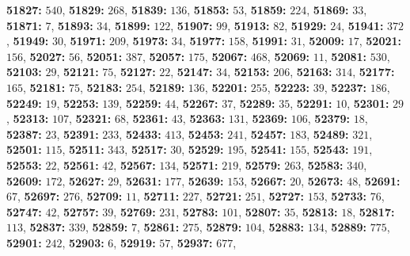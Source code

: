 \textsf{\bfseries 51827:} $540$, \textsf{\bfseries 51829:} $268$, \textsf{\bfseries 51839:} $136$, \textsf{\bfseries 51853:} $53$, \textsf{\bfseries 51859:} $224$, \textsf{\bfseries 51869:} $33$, \textsf{\bfseries 51871:} $7$, \textsf{\bfseries 51893:} $34$, \textsf{\bfseries 51899:} $122$, \textsf{\bfseries 51907:} $99$, \textsf{\bfseries 51913:} $82$, \textsf{\bfseries 51929:} $24$, \textsf{\bfseries 51941:} $372$, \textsf{\bfseries 51949:} $30$, \textsf{\bfseries 51971:} $209$, \textsf{\bfseries 51973:} $34$, \textsf{\bfseries 51977:} $158$, \textsf{\bfseries 51991:} $31$, \textsf{\bfseries 52009:} $17$, \textsf{\bfseries 52021:} $156$, \textsf{\bfseries 52027:} $56$, \textsf{\bfseries 52051:} $387$, \textsf{\bfseries 52057:} $175$, \textsf{\bfseries 52067:} $468$, \textsf{\bfseries 52069:} $11$, \textsf{\bfseries 52081:} $530$, \textsf{\bfseries 52103:} $29$, \textsf{\bfseries 52121:} $75$, \textsf{\bfseries 52127:} $22$, \textsf{\bfseries 52147:} $34$, \textsf{\bfseries 52153:} $206$, \textsf{\bfseries 52163:} $314$, \textsf{\bfseries 52177:} $165$, \textsf{\bfseries 52181:} $75$, \textsf{\bfseries 52183:} $254$, \textsf{\bfseries 52189:} $136$, \textsf{\bfseries 52201:} $255$, \textsf{\bfseries 52223:} $39$, \textsf{\bfseries 52237:} $186$, \textsf{\bfseries 52249:} $19$, \textsf{\bfseries 52253:} $139$, \textsf{\bfseries 52259:} $44$, \textsf{\bfseries 52267:} $37$, \textsf{\bfseries 52289:} $35$, \textsf{\bfseries 52291:} $10$, \textsf{\bfseries 52301:} $29$, \textsf{\bfseries 52313:} $107$, \textsf{\bfseries 52321:} $68$, \textsf{\bfseries 52361:} $43$, \textsf{\bfseries 52363:} $131$, \textsf{\bfseries 52369:} $106$, \textsf{\bfseries 52379:} $18$, \textsf{\bfseries 52387:} $23$, \textsf{\bfseries 52391:} $233$, \textsf{\bfseries 52433:} $413$, \textsf{\bfseries 52453:} $241$, \textsf{\bfseries 52457:} $183$, \textsf{\bfseries 52489:} $321$, \textsf{\bfseries 52501:} $115$, \textsf{\bfseries 52511:} $343$, \textsf{\bfseries 52517:} $30$, \textsf{\bfseries 52529:} $195$, \textsf{\bfseries 52541:} $155$, \textsf{\bfseries 52543:} $191$, \textsf{\bfseries 52553:} $22$, \textsf{\bfseries 52561:} $42$, \textsf{\bfseries 52567:} $134$, \textsf{\bfseries 52571:} $219$, \textsf{\bfseries 52579:} $263$, \textsf{\bfseries 52583:} $340$, \textsf{\bfseries 52609:} $172$, \textsf{\bfseries 52627:} $29$, \textsf{\bfseries 52631:} $177$, \textsf{\bfseries 52639:} $153$, \textsf{\bfseries 52667:} $20$, \textsf{\bfseries 52673:} $48$, \textsf{\bfseries 52691:} $67$, \textsf{\bfseries 52697:} $276$, \textsf{\bfseries 52709:} $11$, \textsf{\bfseries 52711:} $227$, \textsf{\bfseries 52721:} $251$, \textsf{\bfseries 52727:} $153$, \textsf{\bfseries 52733:} $76$, \textsf{\bfseries 52747:} $42$, \textsf{\bfseries 52757:} $39$, \textsf{\bfseries 52769:} $231$, \textsf{\bfseries 52783:} $101$, \textsf{\bfseries 52807:} $35$, \textsf{\bfseries 52813:} $18$, \textsf{\bfseries 52817:} $113$, \textsf{\bfseries 52837:} $339$, \textsf{\bfseries 52859:} $7$, \textsf{\bfseries 52861:} $275$, \textsf{\bfseries 52879:} $104$, \textsf{\bfseries 52883:} $134$, \textsf{\bfseries 52889:} $775$, \textsf{\bfseries 52901:} $242$, \textsf{\bfseries 52903:} $6$, \textsf{\bfseries 52919:} $57$, \textsf{\bfseries 52937:} $677$, 
